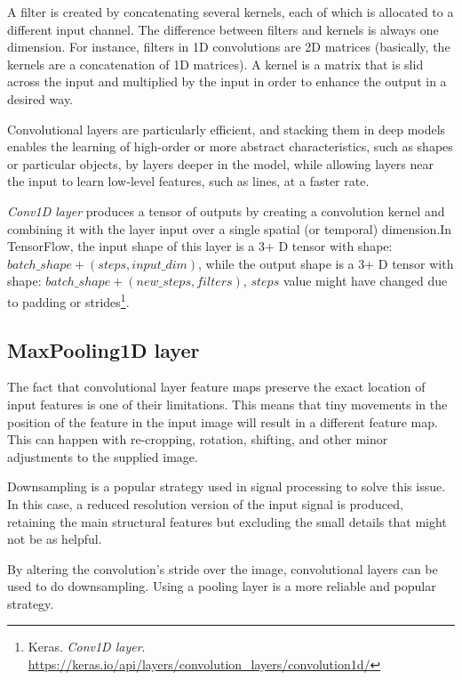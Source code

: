 A filter is created by concatenating several kernels, each of which is allocated to a different input channel. The difference between filters and kernels is always one dimension. For instance, filters in 1D convolutions are 2D matrices (basically, the kernels are a concatenation of 1D matrices). 
A kernel is a matrix that is slid across the input and multiplied by the input in order to enhance the output in a desired way.

Convolutional layers are particularly efficient, and stacking them in deep models enables the learning of high-order or more abstract characteristics, such as shapes or particular objects, by layers deeper in the model, while allowing layers near the input to learn low-level features, such as lines, at a faster rate. 

\emph{Conv1D layer} produces a tensor of outputs by creating a convolution kernel and combining it with the layer input over a single spatial (or temporal) dimension.In TensorFlow, the input shape of this layer is a 3+ D tensor with shape: $batch\_shape + (steps, input\_dim)$, while the output shape is a 3+ D tensor with shape: $batch\_shape + (new\_steps, filters)$, $steps$ value might have changed due to padding or strides\footnote{
	Keras. \textit{Conv1D layer}. \url{https://keras.io/api/layers/convolution_layers/convolution1d/}
}.

\subsection{MaxPooling1D layer}
\hspace{0.5cm}The fact that convolutional layer feature maps preserve the exact location of input features is one of their limitations. This means that tiny movements in the position of the feature in the input image will result in a different feature map. This can happen with re-cropping, rotation, shifting, and other minor adjustments to the supplied image.

Downsampling is a popular strategy used in signal processing to solve this issue. In this case, a reduced resolution version of the input signal is produced, retaining the main structural features but excluding the small details that might not be as helpful.

By altering the convolution's stride over the image, convolutional layers can be used to do downsampling. Using a pooling layer is a more reliable and popular strategy.


